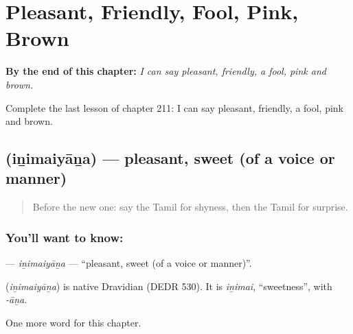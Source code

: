 
\chapter{Pleasant, Friendly, Fool, Pink, Brown}
\label{ch:ta-pleasant-friendly-fool-pink-brown}

\begin{chapteropening}
\textbf{By the end of this chapter:} \emph{I can say pleasant, friendly, a fool, pink and brown.}

Complete the last lesson of chapter 211: I can say pleasant, friendly, a fool, pink and brown.
\end{chapteropening}

\section[\texorpdfstring{\ta{இனிமையான} (iṉimaiyāṉa)}{இனிமையான (iṉimaiyāṉa)}]{ (iṉimaiyāṉa) — pleasant, sweet (of a voice or manner)}

\label{lesson:TA-C211-inimaiyana}



\begin{quote}
Before the new one: say the Tamil for shyness, then the Tamil for surprise.
\end{quote}

\subsection*{You'll want to know: }
\textbf{} — \emph{iṉimaiyāṉa} — \textquotedblleft{}pleasant, sweet (of a voice or manner)\textquotedblright{}.

\begin{cousinweb}
\textbf{} (\emph{iṉimaiyāṉa}) is native Dravidian (DEDR 530). It is \emph{iṉimai}, \textquotedblleft{}sweetness\textquotedblright{}, with \emph{-āṉa}.
\end{cousinweb}

\begin{grammarlens}[title={What you've built}]
One more word for this chapter.
\end{grammarlens}

